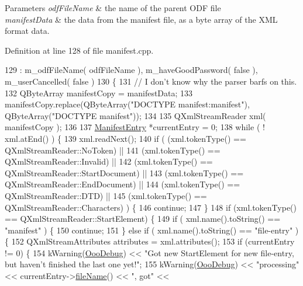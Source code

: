 \begin{DoxyParams}{Parameters}
{\em odf\+File\+Name} & the name of the parent O\+D\+F file \\
\hline
{\em manifest\+Data} & the data from the manifest file, as a byte array of the X\+M\+L format data. \\
\hline
\end{DoxyParams}


Definition at line 128 of file manifest.\+cpp.


\begin{DoxyCode}
129   : m\_odfFileName( odfFileName ), m\_haveGoodPassword( \textcolor{keyword}{false} ), m\_userCancelled( \textcolor{keyword}{false} )
130 \{
131   \textcolor{comment}{// I don't know why the parser barfs on this.}
132   QByteArray manifestCopy = manifestData;
133   manifestCopy.replace(QByteArray(\textcolor{stringliteral}{"DOCTYPE manifest:manifest"}), QByteArray(\textcolor{stringliteral}{"DOCTYPE manifest"}));
134 
135   QXmlStreamReader xml( manifestCopy );
136 
137   \hyperlink{classOOO_1_1ManifestEntry}{ManifestEntry} *currentEntry = 0;
138   \textcolor{keywordflow}{while} ( ! xml.atEnd() ) \{
139     xml.readNext();
140     \textcolor{keywordflow}{if} ( (xml.tokenType() == QXmlStreamReader::NoToken) ||
141      (xml.tokenType() == QXmlStreamReader::Invalid) ||
142      (xml.tokenType() == QXmlStreamReader::StartDocument) ||
143      (xml.tokenType() == QXmlStreamReader::EndDocument) ||
144      (xml.tokenType() == QXmlStreamReader::DTD) || 
145      (xml.tokenType() == QXmlStreamReader::Characters) ) \{
146       \textcolor{keywordflow}{continue};
147     \}
148     \textcolor{keywordflow}{if} (xml.tokenType() == QXmlStreamReader::StartElement) \{
149       \textcolor{keywordflow}{if} ( xml.name().toString() == \textcolor{stringliteral}{"manifest"} ) \{
150     \textcolor{keywordflow}{continue};
151       \} \textcolor{keywordflow}{else} \textcolor{keywordflow}{if} ( xml.name().toString() == \textcolor{stringliteral}{"file-entry"} ) \{
152     QXmlStreamAttributes attributes = xml.attributes();
153     \textcolor{keywordflow}{if} (currentEntry != 0) \{
154       kWarning(\hyperlink{debug_8h_a7cc98d68e6cad31e47e0f4c94664c0da}{OooDebug}) << \textcolor{stringliteral}{"Got new StartElement for new file-entry, but haven't finished the last
       one yet!"};
155       kWarning(\hyperlink{debug_8h_a7cc98d68e6cad31e47e0f4c94664c0da}{OooDebug}) << \textcolor{stringliteral}{"processing"} << currentEntry->\hyperlink{classOOO_1_1ManifestEntry_ae1238ad127da660fdef017046a94b5aa}{fileName}() << \textcolor{stringliteral}{", got"} << 

\end{DoxyCode}
